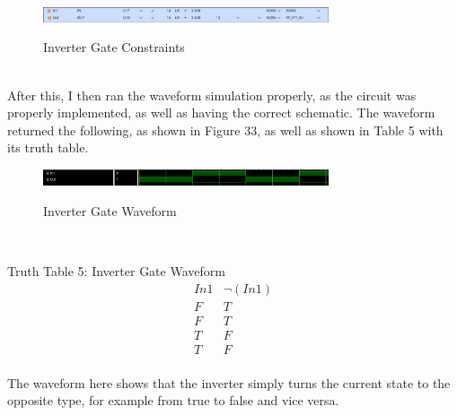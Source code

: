 \documentclass{article}
\begin{document}
\begin{figure}[!!htbpbp]
    \centering
    \caption{Inverter Gate Constraints}
    \includegraphics[width=0.75\textwidth]{Inverter-GATE-CONSTRAINTS.png}
    \label{Inverter Gate, Constrants}
\end{figure}\\
After this, I then ran the waveform simulation properly, as the circuit was properly implemented, as well as having the correct schematic. The waveform returned the following, as shown in Figure 33, as well as shown in Table 5 with its truth table.\\
\begin{figure}[!!htbpbp]
    \centering
    \caption{Inverter Gate Waveform}
    \includegraphics[width=0.75\textwidth]{Inverter-GATE-WAVEFORM.png}
    \label{Inverter Gate, Waveform}
\end{figure}\\
\begin{center}
    Truth Table 5: Inverter Gate Waveform
    \begin{displaymath}
    \begin{array}{|c|c|}
    In1 & \neg(In1)\\
    \hline
    F & T\\
    F & T\\
    T & F\\
    T & F\\
    \end{array}
    \end{displaymath}
\end{center}
The waveform here shows that the inverter simply turns the current state to the opposite type, for example from true to false and vice versa.
\newpage %
\end{document}
